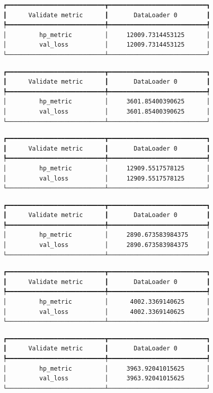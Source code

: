\documentclass[
  letterpaper,
  DIV=11,
  numbers=noendperiod]{scrreprt}
\begin{document}
\begin{verbatim}
┏━━━━━━━━━━━━━━━━━━━━━━━━━━━┳━━━━━━━━━━━━━━━━━━━━━━━━━━━┓
┃      Validate metric      ┃       DataLoader 0        ┃
┡━━━━━━━━━━━━━━━━━━━━━━━━━━━╇━━━━━━━━━━━━━━━━━━━━━━━━━━━┩
│         hp_metric         │     12009.7314453125      │
│         val_loss          │     12009.7314453125      │
└───────────────────────────┴───────────────────────────┘
\end{verbatim}

\begin{verbatim}
┏━━━━━━━━━━━━━━━━━━━━━━━━━━━┳━━━━━━━━━━━━━━━━━━━━━━━━━━━┓
┃      Validate metric      ┃       DataLoader 0        ┃
┡━━━━━━━━━━━━━━━━━━━━━━━━━━━╇━━━━━━━━━━━━━━━━━━━━━━━━━━━┩
│         hp_metric         │     3601.85400390625      │
│         val_loss          │     3601.85400390625      │
└───────────────────────────┴───────────────────────────┘
\end{verbatim}

\begin{verbatim}
┏━━━━━━━━━━━━━━━━━━━━━━━━━━━┳━━━━━━━━━━━━━━━━━━━━━━━━━━━┓
┃      Validate metric      ┃       DataLoader 0        ┃
┡━━━━━━━━━━━━━━━━━━━━━━━━━━━╇━━━━━━━━━━━━━━━━━━━━━━━━━━━┩
│         hp_metric         │     12909.5517578125      │
│         val_loss          │     12909.5517578125      │
└───────────────────────────┴───────────────────────────┘
\end{verbatim}

\begin{verbatim}
┏━━━━━━━━━━━━━━━━━━━━━━━━━━━┳━━━━━━━━━━━━━━━━━━━━━━━━━━━┓
┃      Validate metric      ┃       DataLoader 0        ┃
┡━━━━━━━━━━━━━━━━━━━━━━━━━━━╇━━━━━━━━━━━━━━━━━━━━━━━━━━━┩
│         hp_metric         │     2890.673583984375     │
│         val_loss          │     2890.673583984375     │
└───────────────────────────┴───────────────────────────┘
\end{verbatim}

\begin{verbatim}
┏━━━━━━━━━━━━━━━━━━━━━━━━━━━┳━━━━━━━━━━━━━━━━━━━━━━━━━━━┓
┃      Validate metric      ┃       DataLoader 0        ┃
┡━━━━━━━━━━━━━━━━━━━━━━━━━━━╇━━━━━━━━━━━━━━━━━━━━━━━━━━━┩
│         hp_metric         │      4002.3369140625      │
│         val_loss          │      4002.3369140625      │
└───────────────────────────┴───────────────────────────┘
\end{verbatim}

\begin{verbatim}
┏━━━━━━━━━━━━━━━━━━━━━━━━━━━┳━━━━━━━━━━━━━━━━━━━━━━━━━━━┓
┃      Validate metric      ┃       DataLoader 0        ┃
┡━━━━━━━━━━━━━━━━━━━━━━━━━━━╇━━━━━━━━━━━━━━━━━━━━━━━━━━━┩
│         hp_metric         │     3963.92041015625      │
│         val_loss          │     3963.92041015625      │
└───────────────────────────┴───────────────────────────┘
\end{verbatim}
\end{document}

